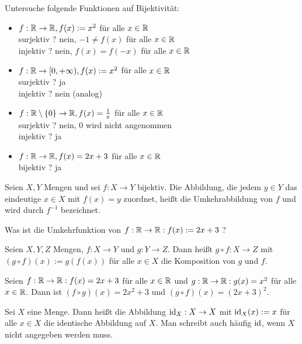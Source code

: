 \begin{bsp}
	Untersuche folgende Funktionen auf Bijektivität:
	\begin{itemize}
		\item $ f : \mathbb{R} \to \mathbb{R}, f(x) := x^2 $ für alle $ x \in \mathbb{R} $\\
		surjektiv ? nein, $ -1 \neq f(x) $ für alle $ x \in \mathbb{R} $\\
		injektiv ? nein, $ f(x) = f(-x) $ für alle $ x \in \mathbb{R} $
		\item $ f : \mathbb{R} \to [0,+\infty), f(x) := x^2 $ für alle $ x \in \mathbb{R} $\\
		surjektiv ? ja\\
		injektiv ? nein (analog)
		\item $ f : \mathbb{R} \setminus \{ 0 \} \to \mathbb{R}, f(x) = \frac{1}{x} $ für alle $ x \in \mathbb{R} $\\
		surjektiv ? nein, 0 wird nicht angenommen\\
		injektiv ? ja
		\item $ f : \mathbb{R} \to \mathbb{R}, f(x) = 2x + 3 $ für alle $ x \in \mathbb{R} $\\
		bijektiv ? ja
	\end{itemize}
\end{bsp}


\begin{defn} 
Seien $ X,Y $ Mengen und sei $ f : X \to Y $ bijektiv. Die Abbildung, die jedem $ y \in Y $ das eindeutige $ x \in X $ mit $ f(x) = y $ zuordnet, heißt die Umkehrabbildung von $ f $ und wird durch $ f^{-1} $ bezeichnet.
\end{defn} 

\begin{aufg}
	Was ist die Umkehrfunktion von $ f : \mathbb{R} \to \mathbb{R} : f(x) := 2x + 3 $ ?
\end{aufg}


\begin{defn}
Seien $ X,Y,Z $ Mengen, $ f : X \to Y $ und $ g : Y \to Z $. Dann heißt $ g \circ f : X \to Z $ mit $ ( g \circ f )(x) := g( f(x) ) $ für alle $ x \in X $ die Komposition von $ g $ und $ f $.
\end{defn}

\begin{bsp}
	Seien $ f : \mathbb{R} \to \mathbb{R} : f(x) = 2x + 3 $ für alle $ x \in \mathbb{R} $ und $ g : \mathbb{R} \to \mathbb{R} : g(x) = x^2 $ für alle $ x \in \mathbb{R} $. Dann ist $ ( f \circ g )(x) = 2x^2 + 3 $ und $ ( g \circ f )(x) = (2x + 3)^2 $.
\end{bsp}


\begin{defn}
Sei $ X $ eine Menge. Dann heißt die Abbildung $ \operatorname{id}_X : X \to X $ mit $ \operatorname{id}_X(x) := x $ für alle $ x \in X $ die identische Abbildung auf $ X $. Man schreibt auch häufig $ \operatorname{id} $, wenn $ X $ nicht angegeben werden muss.
\end{defn}


